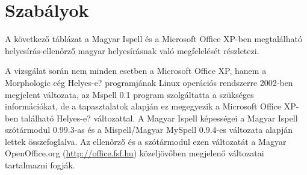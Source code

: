 \def\a#1{\emph{#1}}
\def\b#1{\emph{*#1}}
\def\w#1{\emph{\underline{#1}}}


\def\s#1#2#3#4{
\colorbox{#1}{\parbox[t]{7.8cm}{#2}} &
\colorbox{#3}{\parbox[t]{7.8cm}{#4}} \\ \hline
}

\def\empty#1{
\s{gray}{#1 \textcolor{gray}{X}}{gray}{\textcolor{gray}{X}}
}
\def\emptyx#1#2{
\s{#1}{#2 \textcolor{#1}{X}}{#1}{\textcolor{#1}{X}}
}

\def\title#1{\addcontentsline{toc}{section}{#1}
\emptyx{white}{\emph{#1}}
\s{white}{#1 \textcolor{white}{X}}{white}{\textcolor{white}{X}}
}

%
%

\chapter{Szabályok}

A következő táblázat a Magyar Ispell és a Microsoft Office
XP-ben megtalálható helyesírás-ellenőrző magyar helyesírásnak
való megfelelését részletezi.

A vizsgálat során nem minden esetben a Microsoft Office XP,
hanem a Morphologic
cég Helyes-e? programjának Linux operációs rendszerre
2002-ben megjelent változata, az Mspell 0.1 program
szolgáltatta a szükséges információkat, de a tapasztalatok
alapján ez megegyezik a Microsoft Office XP-ben
található Helyes-e? változattal. A Magyar Ispell
képességei a Magyar Ispell szótármodul 0.99.3-as és
a Mispell/Magyar MySpell 0.9.4-es változata alapján
lettek összefoglalva. Az ellenőrző és a szótármodul
ezen változatát a Magyar OpenOffice.org
(\url{http://office.fsf.hu}) közeljövőben megjelenő
változatai tartalmazni fogják.

